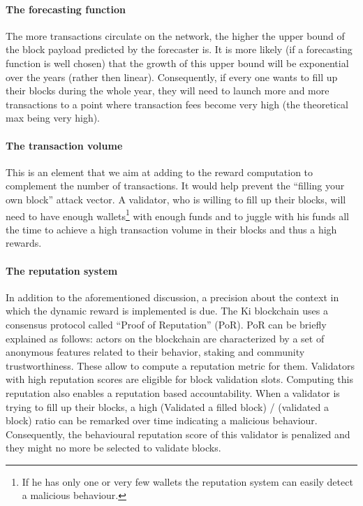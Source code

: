 \documentclass[]{article}
\begin{document}
\paragraph{The forecasting function} The more transactions circulate on the network, the higher the upper bound of the block payload predicted by the forecaster is. It is more likely (if a forecasting function is well chosen) that the growth of this upper bound will be exponential over the years (rather then linear). Consequently, if every one wants to fill up their blocks during the whole year, they will need to launch more and more transactions to a point where transaction fees become very high (the theoretical max being very high).

\paragraph{The transaction volume} This is an element that we aim at adding to the reward computation to complement the number of transactions. It would help prevent the ``filling your own block'' attack vector. A validator, who is willing to fill up their blocks, will need to have enough wallets\footnote{If he has only one or very few wallets the reputation system can easily detect a malicious behaviour.} with enough funds and to juggle with his funds all the time to achieve a high transaction volume in their blocks and thus a high rewards.

\paragraph{The reputation system} In addition to the aforementioned discussion, a precision about the context in which the dynamic reward is implemented is due. The Ki blockchain uses a consensus protocol called ``Proof of Reputation'' (PoR). PoR can be briefly explained as follows: actors on the blockchain are characterized by a set of anonymous features related to their behavior, staking and community trustworthiness. These allow to compute a reputation metric for them. Validators with high reputation scores are eligible for block validation slots. Computing this reputation also enables a reputation based accountability. When a validator is trying to fill up their blocks, a high  (Validated a filled block) / (validated a block) ratio can be remarked over time indicating a malicious behaviour. Consequently, the behavioural reputation score of this validator is penalized and they might no more be selected to validate blocks.
\end{document}
